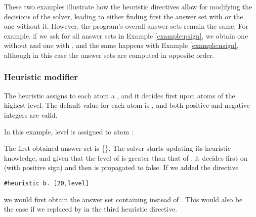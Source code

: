 These two examples illustrate how the heuristic directives allow for modifying the decisions of the solver,
leading to either finding first the answer set with  or the one without it.
However, %
the program's overall answer sets remain the same. %
For example, if we ask for all answer sets in Example \ref{example:psign},
we obtain one without  and one with ,
and the same happens with Example \ref{example:nsign}, 
although in this case the answer sets are computed in opposite order.

\subsubsection{Heuristic modifier }

The  heuristic assigns to each atom a , and it decides first upon atoms of the highest level.
The default value for each atom is ,  and both positive and negative integers are valid.
\begin{example} 
\label{example:level}
In this example,  
level  is assigned to atom :

The first obtained answer set is \mbox{\{\}}.
The solver starts updating its heuristic knowledge, 
and given that the level of  is greater than that of ,
it decides first on  (with positive sign) and then  is propagated to false.
If we added the directive
\begin{lstlisting}[numbers=none]
#heuristic b. [20,level] 
\end{lstlisting}
we would first obtain the answer set containing  instead of .
This would also be the case if we replaced  by  in the third heuristic directive.
\end{example}

